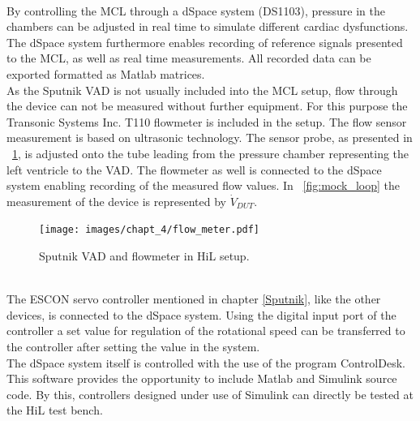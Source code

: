 \\By controlling the MCL through a dSpace system (DS1103), pressure in the chambers can be adjusted in real time to simulate different cardiac dysfunctions. The dSpace system furthermore enables recording of reference signals presented to the MCL, as well as real time measurements. All recorded data can be exported formatted as Matlab matrices.
\\As the Sputnik VAD is not usually included into the MCL setup, flow through the device can not be measured without further equipment. For this purpose the Transonic Systems Inc. T110 flowmeter is included in the setup. The flow sensor measurement is based on ultrasonic technology. The sensor probe, as presented in \figurename~\ref{fig:flow_meter_tube}, is adjusted onto the tube leading from the pressure chamber representing the left ventricle to the VAD. The flowmeter as well is connected to the dSpace system enabling recording of the measured flow values. In \figurename~\ref{fig:mock_loop} the measurement of the device is represented by $\dot{V}_{DUT}$.
\begin{figure}[ht]
  \centering
  \texttt{[image: images/chapt\_4/flow\_meter.pdf]}
  \caption[Sputnik VAD and flowmeter in HiL setup]{Sputnik VAD and flowmeter in HiL setup.}
  \label{fig:flow_meter_tube}
\end{figure}
\\The ESCON servo controller mentioned in chapter \ref{Sputnik}, like the other devices, is connected to the dSpace system. Using the digital input port of the controller a set value for regulation of the rotational speed can be transferred to the controller after setting the value in the system.
\\The dSpace system itself is controlled with the use of the program ControlDesk. This software provides the opportunity to include Matlab and Simulink source code. By this, controllers designed under use of Simulink can directly be tested at the HiL test bench.

